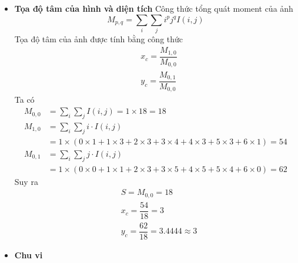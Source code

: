                \begin{itemize}
                    \item \textbf{Tọa độ tâm của hình và diện tích}
                    \newline
                    \hspace*{0.6cm}Công thức tổng quát moment của ảnh
                    \begin{equation}
                         M_{p,q} = \sum_{i} \sum_{j} i^p j^q I(i,j) 
                         \label{eq:s1_eq1}
                    \end{equation}                    
                    \hspace*{0.6cm}Tọa độ tâm của ảnh được tính bằng công thức
                    \begin{align}
                         &x_c = \dfrac{M_{1,0}}{M_{0,0}} \label{eq:s1_eq2}\\
                         &y_c = \dfrac{M_{0,1}}{M_{0,0}} \label{eq:s1_eq3}
                    \end{align}    
                    \hspace*{0.6cm}Ta có
                    \begin{align*}
                         M_{0,0} &= \sum_{i} \sum_{j} I(i,j) = 1 \times 18 = 18\\
                         M_{1,0} &= \sum_{i} \sum_{j} i \cdot I(i,j) \\
                                 &= 1 \times (0 \times 1 + 1 \times 3 + 2 \times 3 + 3 \times 4 + 4 \times 3 + 5 \times 3 + 6 \times 1) = 54\\
                         M_{0,1} &= \sum_{i} \sum_{j} j \cdot I(i,j) \\
                                 &= 1 \times (0 \times 0 + 1 \times 1 + 2 \times 3 + 3 \times 5 + 4 \times 5 + 5 \times 4 + 6 \times 0) = 62
                    \end{align*}
                    \hspace*{0.6cm}Suy ra
                    \begin{align*}
                         &S = M_{0,0} = 18\\
                         &x_c = \dfrac{54}{18} = 3\\
                         &y_c = \dfrac{62}{18} = 3.4444 \approx 3
                    \end{align*}
                    \item \textbf{Chu vi}
                    \newline

\end{itemize}
